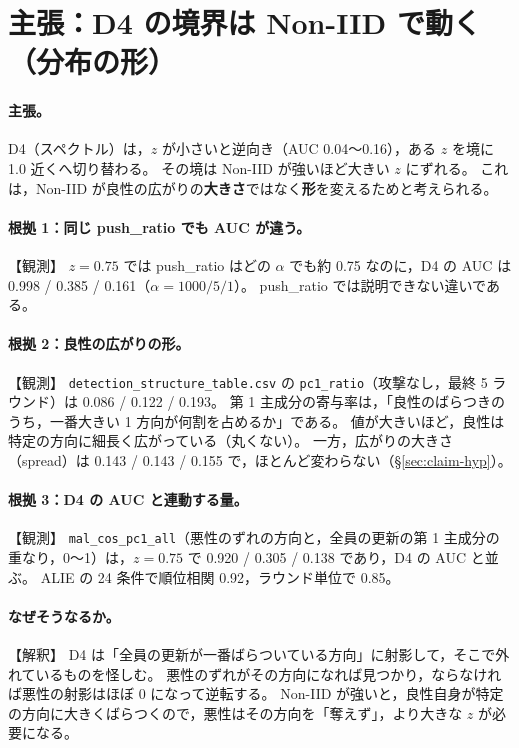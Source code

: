 \documentclass[a4j, dvipdfmx]{jsarticle}  %
\begin{document}
\section{主張：D4 の境界は Non-IID で動く（分布の形）}
\label{sec:claim-d4}

\paragraph{主張。}
D4（スペクトル）は，$z$ が小さいと逆向き（AUC 0.04〜0.16），ある $z$ を境に 1.0 近くへ切り替わる。
その境は Non-IID が強いほど大きい $z$ にずれる。
これは，Non-IID が良性の広がりの\textbf{大きさ}ではなく\textbf{形}を変えるためと考えられる。

\paragraph{根拠 1：同じ push\_ratio でも AUC が違う。}【観測】
$z = 0.75$ では push\_ratio はどの $\alpha$ でも約 0.75 なのに，D4 の AUC は 0.998 / 0.385 / 0.161（$\alpha = 1000 / 5 / 1$）。
push\_ratio では説明できない違いである。

\paragraph{根拠 2：良性の広がりの形。}【観測】
\texttt{detection\_structure\_table.csv} の \texttt{pc1\_ratio}（攻撃なし，最終 5 ラウンド）は 0.086 / 0.122 / 0.193。
第 1 主成分の寄与率は，「良性のばらつきのうち，一番大きい 1 方向が何割を占めるか」である。
値が大きいほど，良性は特定の方向に細長く広がっている（丸くない）。
一方，広がりの大きさ（spread）は 0.143 / 0.143 / 0.155 で，ほとんど変わらない（\S\ref{sec:claim-hyp}）。

\paragraph{根拠 3：D4 の AUC と連動する量。}【観測】
\texttt{mal\_cos\_pc1\_all}（悪性のずれの方向と，全員の更新の第 1 主成分の重なり，0〜1）は，$z = 0.75$ で 0.920 / 0.305 / 0.138 であり，D4 の AUC と並ぶ。
ALIE の 24 条件で順位相関 0.92，ラウンド単位で 0.85。

\paragraph{なぜそうなるか。}【解釈】
D4 は「全員の更新が一番ばらついている方向」に射影して，そこで外れているものを怪しむ。
悪性のずれがその方向になれば見つかり，ならなければ悪性の射影はほぼ 0 になって逆転する。
Non-IID が強いと，良性自身が特定の方向に大きくばらつくので，悪性はその方向を「奪えず」，より大きな $z$ が必要になる。
\end{document}
